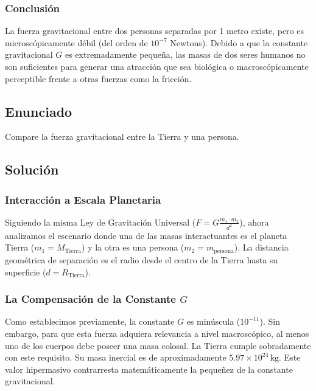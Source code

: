 \documentclass[12pt]{article}
\begin{document}
\subsubsection*{Conclusión}
La fuerza gravitacional entre dos personas separadas por 1 metro existe, pero es microscópicamente débil (del orden de $10^{-7}$ Newtons). Debido a que la constante gravitacional $G$ es extremadamente pequeña, las masas de dos seres humanos no son suficientes para generar una atracción que sea biológica o macroscópicamente perceptible frente a otras fuerzas como la fricción.

\newpage

\subsection*{Enunciado}
Compare la fuerza gravitacional entre la Tierra y una persona.

\subsection*{Solución}

\subsubsection*{Interacción a Escala Planetaria}
Siguiendo la misma Ley de Gravitación Universal ($F = G \frac{m_1 \cdot m_2}{d^2}$), ahora analizamos el escenario donde una de las masas interactuantes es el planeta Tierra ($m_1 = M_{\text{Tierra}}$) y la otra es una persona ($m_2 = m_{\text{persona}}$). La distancia geométrica de separación es el radio desde el centro de la Tierra hasta su superficie ($d = R_{\text{Tierra}}$).

\subsubsection*{La Compensación de la Constante $G$}
Como establecimos previamente, la constante $G$ es minúscula ($10^{-11}$). Sin embargo, para que esta fuerza adquiera relevancia a nivel macroscópico, al menos uno de los cuerpos debe poseer una masa colosal. La Tierra cumple sobradamente con este requisito. Su masa inercial es de aproximadamente $5.97 \times 10^{24} \, \text{kg}$. Este valor hipermasivo contrarresta matemáticamente la pequeñez de la constante gravitacional.
\end{document}
